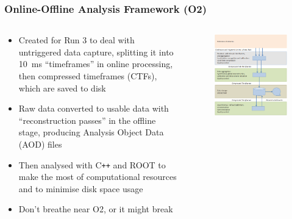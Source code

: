 \documentclass[10pt]{beamer}
\begin{document}
\begin{frame}
    \frametitle{Online-Offline Analysis Framework (O2)}

    \begin{columns}[c]
        \begin{column}{0.6\textwidth}
            \begin{itemize}
                \item Created for Run 3 to deal with untriggered data capture, splitting it into \SI{10}{\milli\second} ``timeframes'' in online processing, then compressed timeframes (CTFs), which are saved to disk
                \item Raw data converted to usable data with ``reconstruction passes'' in the offline stage, producing Analysis Object Data (AOD) files
                \item Then analysed with C\texttt{++} and ROOT to make the most of computational resources and to minimise disk space usage
                \item Don't breathe near O2, or it might break
            \end{itemize}
        \end{column}

        \begin{column}{0.4\textwidth}
            \begin{figure}
                \begin{center}
                    \includegraphics[width=\textwidth]{Figs/O2_flow.png}
                \end{center}
            \end{figure}
        \end{column}
    \end{columns}

\end{frame}
\end{document}
